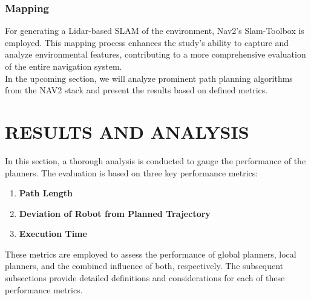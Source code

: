 \documentclass[sigconf]{acmart}
\begin{document}
\subsubsection{Mapping}
For generating a Lidar-based SLAM of the environment, Nav2's Slam-Toolbox is employed. This mapping process enhances the study's ability to capture and analyze environmental features, contributing to a more comprehensive evaluation of the entire navigation system. 
\\

In the upcoming section, we will analyze prominent path planning algorithms from the NAV2 stack and present the results based on defined metrics.












\section{RESULTS AND ANALYSIS}

In this section, a thorough analysis is conducted to gauge the performance of the planners. The evaluation is based on three key performance metrics:

\begin{enumerate}
    \item \textbf{Path Length}
    \item \textbf{Deviation of Robot from Planned Trajectory}
    \item \textbf{Execution Time}
\end{enumerate}

These metrics are employed to assess the performance of global planners, local planners, and the combined influence of both, respectively. The subsequent subsections provide detailed definitions and considerations for each of these performance metrics.
\end{document}
